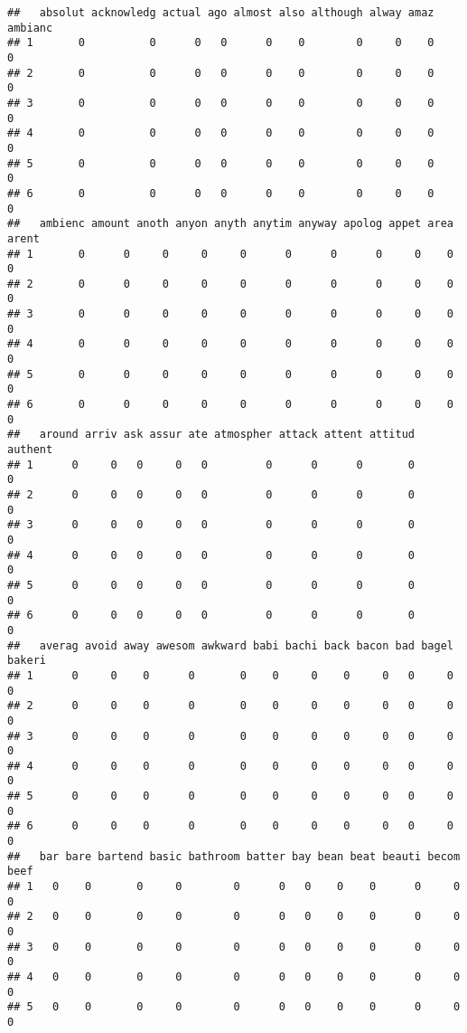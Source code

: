 \documentclass[]{article}
\begin{document}
\begin{verbatim}
##   absolut acknowledg actual ago almost also although alway amaz ambianc
## 1       0          0      0   0      0    0        0     0    0       0
## 2       0          0      0   0      0    0        0     0    0       0
## 3       0          0      0   0      0    0        0     0    0       0
## 4       0          0      0   0      0    0        0     0    0       0
## 5       0          0      0   0      0    0        0     0    0       0
## 6       0          0      0   0      0    0        0     0    0       0
##   ambienc amount anoth anyon anyth anytim anyway apolog appet area arent
## 1       0      0     0     0     0      0      0      0     0    0     0
## 2       0      0     0     0     0      0      0      0     0    0     0
## 3       0      0     0     0     0      0      0      0     0    0     0
## 4       0      0     0     0     0      0      0      0     0    0     0
## 5       0      0     0     0     0      0      0      0     0    0     0
## 6       0      0     0     0     0      0      0      0     0    0     0
##   around arriv ask assur ate atmospher attack attent attitud authent
## 1      0     0   0     0   0         0      0      0       0       0
## 2      0     0   0     0   0         0      0      0       0       0
## 3      0     0   0     0   0         0      0      0       0       0
## 4      0     0   0     0   0         0      0      0       0       0
## 5      0     0   0     0   0         0      0      0       0       0
## 6      0     0   0     0   0         0      0      0       0       0
##   averag avoid away awesom awkward babi bachi back bacon bad bagel bakeri
## 1      0     0    0      0       0    0     0    0     0   0     0      0
## 2      0     0    0      0       0    0     0    0     0   0     0      0
## 3      0     0    0      0       0    0     0    0     0   0     0      0
## 4      0     0    0      0       0    0     0    0     0   0     0      0
## 5      0     0    0      0       0    0     0    0     0   0     0      0
## 6      0     0    0      0       0    0     0    0     0   0     0      0
##   bar bare bartend basic bathroom batter bay bean beat beauti becom beef
## 1   0    0       0     0        0      0   0    0    0      0     0    0
## 2   0    0       0     0        0      0   0    0    0      0     0    0
## 3   0    0       0     0        0      0   0    0    0      0     0    0
## 4   0    0       0     0        0      0   0    0    0      0     0    0
## 5   0    0       0     0        0      0   0    0    0      0     0    0

\end{verbatim}
\end{document}
